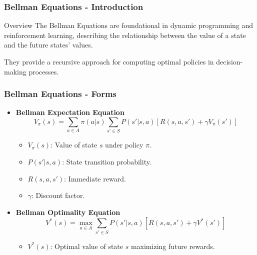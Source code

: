 \documentclass[aspectratio=169]{beamer}
\begin{document}
\begin{frame}[fragile]
    \frametitle{Bellman Equations - Introduction}
    \begin{block}{Overview}
        The Bellman Equations are foundational in dynamic programming and reinforcement learning, describing the relationship between the value of a state and the future states' values.
    \end{block}
    They provide a recursive approach for computing optimal policies in decision-making processes.
\end{frame}

\begin{frame}[fragile]
    \frametitle{Bellman Equations - Forms}
    \begin{itemize}
        \item \textbf{Bellman Expectation Equation}
          \begin{equation}
              V_\pi(s) = \sum_{a \in A} \pi(a|s) \sum_{s' \in S} P(s'|s, a)\left[R(s, a, s') + \gamma V_\pi(s')\right]
          \end{equation}
          \begin{itemize}
              \item $V_\pi(s)$: Value of state $s$ under policy $\pi$.
              \item $P(s'|s, a)$: State transition probability.
              \item $R(s, a, s')$: Immediate reward.
              \item $\gamma$: Discount factor.
          \end{itemize}

        \item \textbf{Bellman Optimality Equation}
          \begin{equation}
              V^*(s) = \max_{a \in A} \sum_{s' \in S} P(s'|s, a)\left[R(s, a, s') + \gamma V^*(s')\right]
          \end{equation}
          \begin{itemize}
              \item $V^*(s)$: Optimal value of state $s$ maximizing future rewards.
          \end{itemize}
    \end{itemize}
\end{frame}
\end{document}
